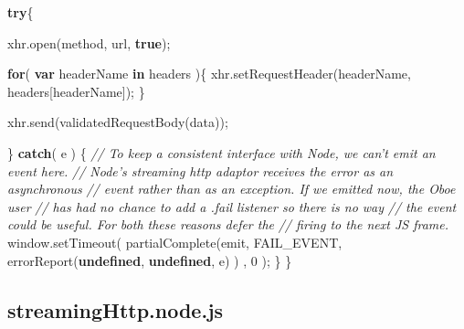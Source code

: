 \documentclass[12pt, ]{article}
\newenvironment{Shaded}{}{}
\newcommand{\KeywordTok}[1]{\textcolor[rgb]{0.00,0.44,0.13}{\textbf{{#1}}}}
\newcommand{\DecValTok}[1]{\textcolor[rgb]{0.25,0.63,0.44}{{#1}}}
\newcommand{\CommentTok}[1]{\textcolor[rgb]{0.38,0.63,0.69}{\textit{{#1}}}}
\newcommand{\OtherTok}[1]{\textcolor[rgb]{0.00,0.44,0.13}{{#1}}}
\newcommand{\FunctionTok}[1]{\textcolor[rgb]{0.02,0.16,0.49}{{#1}}}
\newcommand{\NormalTok}[1]{{#1}}
\begin{document}
\begin{Shaded}
\begin{Highlighting}[]
   \KeywordTok{try}\NormalTok{\{}
   
      \OtherTok{xhr}\NormalTok{.}\FunctionTok{open}\NormalTok{(method, url, }\KeywordTok{true}\NormalTok{);}
   
      \KeywordTok{for}\NormalTok{( }\KeywordTok{var} \NormalTok{headerName }\KeywordTok{in} \NormalTok{headers )\{}
         \OtherTok{xhr}\NormalTok{.}\FunctionTok{setRequestHeader}\NormalTok{(headerName, headers[headerName]);}
      \NormalTok{\}}
      
      \OtherTok{xhr}\NormalTok{.}\FunctionTok{send}\NormalTok{(}\FunctionTok{validatedRequestBody}\NormalTok{(data));}
      
   \NormalTok{\} }\KeywordTok{catch}\NormalTok{( e ) \{}
      \CommentTok{// To keep a consistent interface with Node, we can't emit an event here.}
      \CommentTok{// Node's streaming http adaptor receives the error as an asynchronous}
      \CommentTok{// event rather than as an exception. If we emitted now, the Oboe user}
      \CommentTok{// has had no chance to add a .fail listener so there is no way}
      \CommentTok{// the event could be useful. For both these reasons defer the}
      \CommentTok{// firing to the next JS frame.  }
      \OtherTok{window}\NormalTok{.}\FunctionTok{setTimeout}\NormalTok{(}
         \FunctionTok{partialComplete}\NormalTok{(emit, FAIL_EVENT, }
             \FunctionTok{errorReport}\NormalTok{(}\KeywordTok{undefined}\NormalTok{, }\KeywordTok{undefined}\NormalTok{, e)}
         \NormalTok{)}
      \NormalTok{,  }\DecValTok{0}
      \NormalTok{);}
   \NormalTok{\}            }
\NormalTok{\}}
\end{Highlighting}
\end{Shaded}

\pagebreak

\subsection{streamingHttp.node.js}\label{headerux5fstreamingHttp.node}

\label{src_streamingHttp.node}
\end{document}
